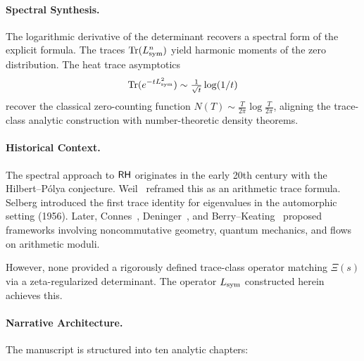 \paragraph*{Spectral Synthesis.}
The logarithmic derivative of the determinant recovers a spectral form of the explicit formula. The traces \( \operatorname{Tr}(L_{\mathrm{sym}}^n) \) yield harmonic moments of the zero distribution. The heat trace asymptotics
\[
\operatorname{Tr}(e^{-t L_{\mathrm{sym}}^2}) \sim \tfrac{1}{\sqrt{t}} \log(1/t)
\]
recover the classical zero-counting function \( N(T) \sim \tfrac{T}{2\pi} \log \tfrac{T}{2\pi} \), aligning the trace-class analytic construction with number-theoretic density theorems.

\paragraph*{Historical Context.}
The spectral approach to \(\mathsf{RH}\) originates in the early 20th century with the Hilbert--Pólya conjecture. Weil~\cite{Weil1952Explicite} reframed this as an arithmetic trace formula. Selberg introduced the first trace identity for eigenvalues in the automorphic setting (1956). Later, Connes~\cite{Connes1999TraceFormula}, Deninger~\cite{Deninger1998Frobenius}, and Berry--Keating~\cite{Berry1986RiemannSpectra} proposed frameworks involving noncommutative geometry, quantum mechanics, and flows on arithmetic moduli.

However, none provided a rigorously defined trace-class operator matching \( \Xi(s) \) via a zeta-regularized determinant. The operator \( L_{\mathrm{sym}} \) constructed herein achieves this.

\paragraph*{Narrative Architecture.}
The manuscript is structured into ten analytic chapters:

